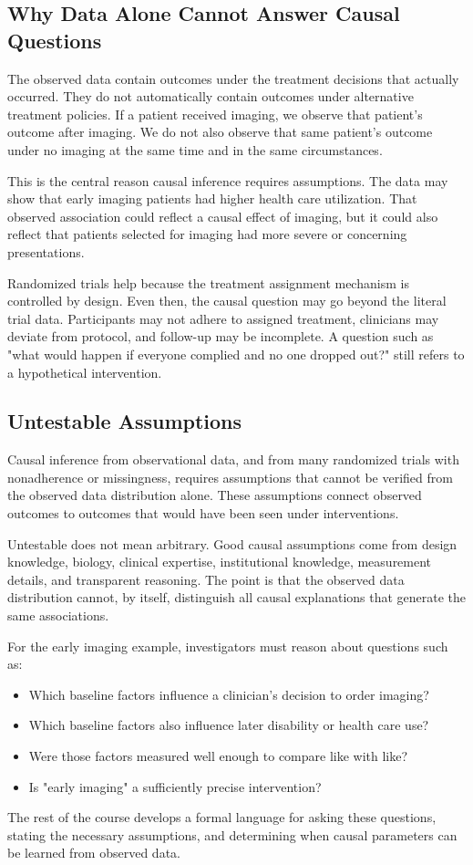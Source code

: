 \subsection{Why Data Alone Cannot Answer Causal Questions}

The observed data contain outcomes under the treatment decisions that actually occurred. They do not automatically contain outcomes under alternative treatment policies. If a patient received imaging, we observe that patient's outcome after imaging. We do not also observe that same patient's outcome under no imaging at the same time and in the same circumstances.

This is the central reason causal inference requires assumptions. The data may show that early imaging patients had higher health care utilization. That observed association could reflect a causal effect of imaging, but it could also reflect that patients selected for imaging had more severe or concerning presentations.

Randomized trials help because the treatment assignment mechanism is controlled by design. Even then, the causal question may go beyond the literal trial data. Participants may not adhere to assigned treatment, clinicians may deviate from protocol, and follow-up may be incomplete. A question such as "what would happen if everyone complied and no one dropped out?" still refers to a hypothetical intervention.

\subsection{Untestable Assumptions}

\begin{assumptionbox}
Causal inference from observational data, and from many randomized trials with nonadherence or missingness, requires assumptions that cannot be verified from the observed data distribution alone. These assumptions connect observed outcomes to outcomes that would have been seen under interventions.
\end{assumptionbox}

Untestable does not mean arbitrary. Good causal assumptions come from design knowledge, biology, clinical expertise, institutional knowledge, measurement details, and transparent reasoning. The point is that the observed data distribution cannot, by itself, distinguish all causal explanations that generate the same associations.

For the early imaging example, investigators must reason about questions such as:
\begin{itemize}
  \item Which baseline factors influence a clinician's decision to order imaging?
  \item Which baseline factors also influence later disability or health care use?
  \item Were those factors measured well enough to compare like with like?
  \item Is "early imaging" a sufficiently precise intervention?
\end{itemize}

The rest of the course develops a formal language for asking these questions, stating the necessary assumptions, and determining when causal parameters can be learned from observed data.
